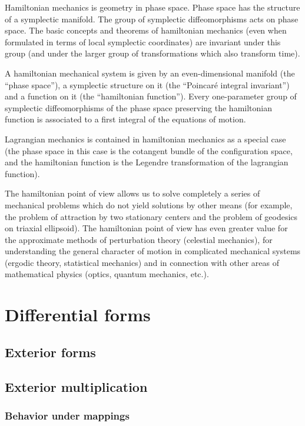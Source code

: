\documentclass[leqno]{report}
\numberwithin{equation}{section}
\theoremstyle{plain}
\theoremstyle{definition}
\theoremstyle{remark}
\theoremstyle{smallcap}
\numberwithin{prob}{section}
\begin{document}
Hamiltonian mechanics is geometry in phase space.
%
Phase space has the structure of a symplectic manifold.
%
The group of symplectic diffeomorphisms acts on phase space.
%
The basic concepts and theorems of hamiltonian mechanics
(even when formulated in terms of local symplectic coordinates)
are invariant under this group
(and under the larger group of transformations which also transform time).

A hamiltonian mechanical system is given by an even-dimensional
manifold (the ``phase space''),
a symplectic structure on it (the ``Poincar\'e integral invariant'')
and a function on it (the ``hamiltonian function'').
%
Every one-parameter group of symplectic diffeomorphisms of the phase space
preserving the hamiltonian function is associated to a first integral of
the equations of motion.

Lagrangian mechanics is contained in hamiltonian mechanics as a special
case (the phase space in this case is the cotangent bundle
of the configuration space, and the hamiltonian function is
the Legendre transformation of the lagrangian function).

The hamiltonian point of view allows us to solve completely a series of
mechanical problems which do not yield solutions by other means
(for example, the problem of attraction by two stationary centers
and the problem of geodesics on triaxial ellipsoid).
%
The hamiltonian point of view has even greater value for the approximate
methods of perturbation theory (celestial mechanics),
for understanding the general character of motion
in complicated mechanical systems (ergodic theory, statistical mechanics)
and in connection with other areas of mathematical physics
(optics, quantum mechanics, etc.).

\chapter{Differential forms}

\section{Exterior forms}

\section{Exterior multiplication}



\setcounter{subsection}{2}
\subsection{\label{sec:exterior_mapping}Behavior under mappings}
\end{document}
